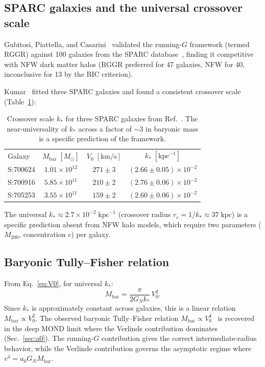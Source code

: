 \documentclass[prd,twocolumn,superscriptaddress,longbibliography,floatfix]{revtex4-2}
\newcommand{\Msun}{M_\odot}
\begin{document}
\subsection{SPARC galaxies and the universal crossover scale}

Gubitosi, Piattella, and Casarini~\cite{Gubitosi2024}
validated the running-$G$ framework (termed RGGR) against 100
galaxies from the SPARC database~\cite{SPARC2016}, finding it
competitive with NFW dark matter halos (RGGR preferred for
47 galaxies, NFW for 40, inconclusive for 13 by the BIC
criterion).

Kumar~\cite{Kumar2025} fitted three SPARC galaxies and found a
consistent crossover scale
(Table~\ref{tab:sparc}):

\begin{table}[t]
\caption{\label{tab:sparc}Crossover scale $k_*$ for three
SPARC galaxies from Ref.~\cite{Kumar2025}.  The near-universality
of $k_*$ across a factor of $\sim\!3$ in baryonic mass is a
specific prediction of the framework.}
\begin{ruledtabular}
\begin{tabular}{lccc}
Galaxy & $M_{\mathrm{bar}}\;[\Msun]$ & $V_0\;[\mathrm{km/s}]$
& $k_*\;[\mathrm{kpc}^{-1}]$ \\
\colrule
S:700624 & $1.01\times 10^{12}$ & $271 \pm 3$
& $(2.66 \pm 0.05)\!\times\!10^{-2}$ \\
S:700916 & $5.85\times 10^{11}$ & $210 \pm 2$
& $(2.76 \pm 0.06)\!\times\!10^{-2}$ \\
S:705253 & $3.55\times 10^{11}$ & $159 \pm 2$
& $(2.60 \pm 0.06)\!\times\!10^{-2}$ \\
\end{tabular}
\end{ruledtabular}
\end{table}

The universal $k_* \approx 2.7 \times 10^{-2}\;\mathrm{kpc}^{-1}$
(crossover radius $r_c = 1/k_* \approx 37\;\mathrm{kpc}$) is
a specific prediction absent from NFW halo models, which
require two parameters ($M_{200}$, concentration $c$) per galaxy.

\subsection{Baryonic Tully--Fisher relation}

From Eq.~\eqref{eq:V0}, for universal $k_*$:
\begin{equation}
M_{\mathrm{bar}} = \frac{\pi}{2G_N k_*}\,V_0^2.
\label{eq:BTFR_quadratic}
\end{equation}
Since $k_*$ is approximately constant across galaxies, this
is a linear relation $M_{\mathrm{bar}} \propto V_0^2$.
The observed baryonic Tully--Fisher relation
$M_{\mathrm{bar}} \propto V_0^4$~\cite{McGaughBTFR2000}
is recovered in the deep MOND limit where the Verlinde
contribution dominates (Sec.~\ref{sec:a0}).
The running-$G$ contribution gives the correct
intermediate-radius behavior, while the Verlinde contribution
governs the asymptotic regime where
$v^4 = a_0 G_N M_{\mathrm{bar}}$.
\end{document}
